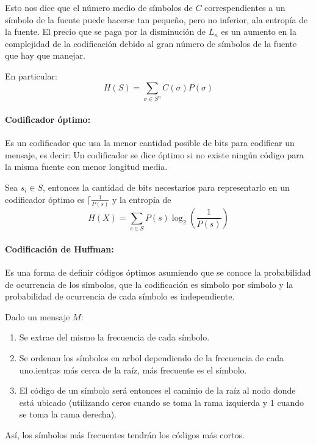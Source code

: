 Esto nos dice que el número medio de símbolos de \(C\) correspendientes a un símbolo de la fuente puede hacerse tan pequeño, pero no inferior, ala entropía de la fuente. El precio que se paga por la disminución de \(L_n\) es un aumento en la complejidad de la codificación debido al gran número de símbolos de la fuente que hay que manejar.

En particular:
\[
  H(S) = \sum_{\sigma\in S^n} C(\sigma)P(\sigma)  
\]

\paragraph{Codificador óptimo:} Es un codificador que usa la menor cantidad posible de bits para codificar un mensaje, es decir: Un codificador se dice óptimo si no existe ningún código para la misma fuente con menor longitud media.

Sea \(s_i\in S\), entonces la cantidad de bits necestarios para representarlo en un codificador óptimo es \(\lceil\frac{1}{P(s)}\) y la entropía de \[H(X) = \sum_{s\in S} P(s)\log_2\left(\frac{1}{P(s)}\right)\]

\paragraph{Codificación de Huffman:} Es una forma de definir códigos óptimos asumiendo que se conoce la probabilidad de ocurrencia de los símbolos, que la codificación es símbolo por símbolo y la probabilidad de ocurrencia de cada símbolo es independiente.

Dado un mensaje \(M\):
\begin{enumerate}
  \item Se extrae del mismo la frecuencia de cada símbolo.
  \item Se ordenan los símbolos en arbol dependiendo de la frecuencia de cada uno.ientras más cerca de la raíz, más frecuente es el símbolo.
  \item El código de un símbolo será entonces el caminio de la raíz al nodo donde está ubicado (utilizando
  ceros cuando se toma la rama izquierda y 1 cuando se toma la rama derecha).
\end{enumerate} 

Así, los símbolos más frecuentes tendrán los códigos más cortos.



